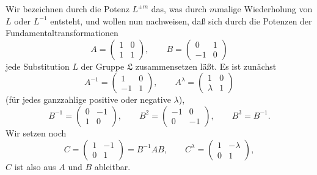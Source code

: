 \documentclass[11pt]{article}
\begin{document}
Wir bezeichnen durch die Potenz $L^{\pm m}$ das, was durch $m$malige Wiederholung von $L$ oder $L^{-1}$ entsteht, und wollen nun nachweisen, daß sich durch die Potenzen der Fundamentaltransformationen
\begin{equation}
A=\begin{pmatrix}1&0\\1&1\end{pmatrix},
\qquad
B=\begin{pmatrix}0&1\\-1&0\end{pmatrix} \tag{2}
\end{equation}
jede Substitution $L$ der Gruppe $\mathfrak L$ zusammensetzen läßt. Es ist zunächst
\begin{equation}
A^{-1}=\begin{pmatrix}1&0\\-1&1\end{pmatrix},
\qquad
A^\lambda=\begin{pmatrix}1&0\\ \lambda&1\end{pmatrix} \tag{3}
\end{equation}
(für jedes ganzzahlige positive oder negative $\lambda$),
\begin{equation}
B^{-1}=\begin{pmatrix}0&-1\\1&0\end{pmatrix},
\qquad
B^2=\begin{pmatrix}-1&0\\0&-1\end{pmatrix},
\qquad
B^3=B^{-1}. \tag{4}
\end{equation}
Wir setzen noch
\begin{equation}
C=\begin{pmatrix}1&-1\\0&1\end{pmatrix}=B^{-1}AB,
\qquad
C^\lambda=\begin{pmatrix}1&-\lambda\\0&1\end{pmatrix}, \tag{5}
\end{equation}
$C$ ist also aus $A$ und $B$ ableitbar.
\end{document}
